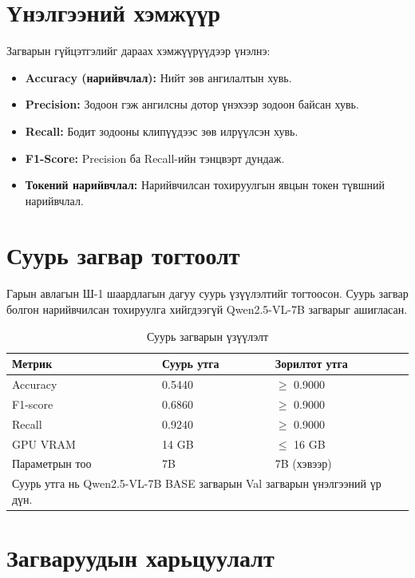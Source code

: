 \section{Үнэлгээний хэмжүүр}

Загварын гүйцэтгэлийг дараах хэмжүүрүүдээр үнэлнэ:

\begin{itemize}
    \item \textbf{Accuracy (нарийвчлал):} Нийт зөв ангилалтын хувь.
    \item \textbf{Precision:} Зодоон гэж ангилсны дотор үнэхээр зодоон байсан хувь.
    \item \textbf{Recall:} Бодит зодооны клипүүдээс зөв илрүүлсэн хувь.
    \item \textbf{F1-Score:} Precision ба Recall-ийн тэнцвэрт дундаж.
    \item \textbf{Токений нарийвчлал:} Нарийвчилсан тохируулгын явцын токен түвшний нарийвчлал.
\end{itemize}

\section{Суурь загвар тогтоолт}

Гарын авлагын Ш-1 шаардлагын дагуу суурь үзүүлэлтийг тогтоосон. Суурь загвар болгон нарийвчилсан тохируулга хийгдээгүй Qwen2.5-VL-7B загварыг ашигласан.

\begin{table}[htbp]
\centering
\caption{Суурь загварын үзүүлэлт}
\label{tab:baseline}
\begin{tabular}{lll}
\hline
\textbf{Метрик} & \textbf{Суурь утга} & \textbf{Зорилтот утга} \\
\hline
Accuracy              & 0.5440                   & $\geq$ 0.9000 \\
F1-score              & 0.6860                   & $\geq$ 0.9000 \\
Recall                & 0.9240                   & $\geq$ 0.9000 \\
GPU VRAM              & 14 GB                     & $\leq$ 16 GB \\
Параметрын тоо        & 7B                        & 7B (хэвээр) \\
\hline
\multicolumn{3}{l}{\footnotesize Суурь утга нь Qwen2.5-VL-7B BASE загварын Val загварын үнэлгээний үр дүн.}
\end{tabular}
\end{table}

\section{Загваруудын харьцуулалт}

